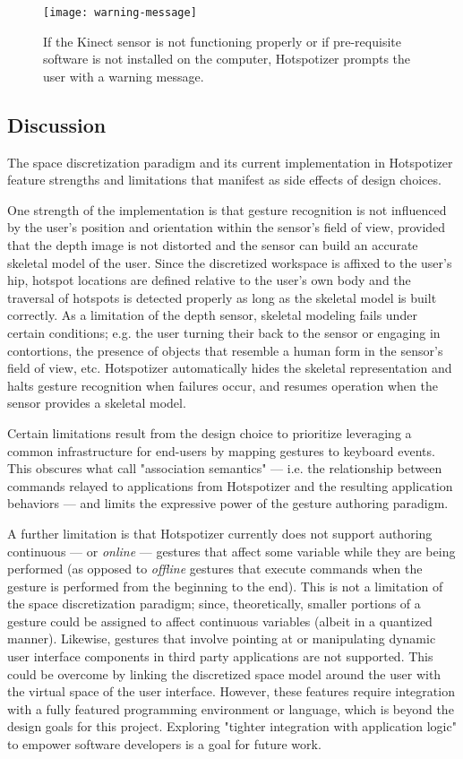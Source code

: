 \begin{SCfigure}[3][ht]
\centering
\texttt{[image: warning-message]}
\caption{If the Kinect sensor is not functioning properly or if pre-requisite software is not installed on the computer, Hotspotizer prompts the user with a warning message.}
\label{fig:warning-message}
\end{SCfigure}

\subsection{Discussion}

The space discretization paradigm and its current implementation in Hotspotizer feature strengths and limitations that manifest as side effects of design choices.

One strength of the implementation is that gesture recognition is not influenced by the user's position and orientation within the sensor's field of view, provided that the depth image is not distorted and the sensor can build an accurate skeletal model of the user. Since the discretized workspace is affixed to the user's hip, hotspot locations are defined relative to the user's own body and the traversal of hotspots is detected properly as long as the skeletal model is built correctly. As a limitation of the depth sensor, skeletal modeling fails under certain conditions; e.g. the user turning their back to the sensor or engaging in contortions, the presence of objects that resemble a human form in the sensor's field of view, etc. Hotspotizer automatically hides the skeletal representation and halts gesture recognition when failures occur, and resumes operation when the sensor provides a skeletal model.

Certain limitations result from the design choice to prioritize leveraging a common infrastructure for end-users by mapping gestures to keyboard events. This obscures what \textcite{Hartmann:2007} call "association semantics" --- i.e. the relationship between commands relayed to applications from Hotspotizer and the resulting application behaviors --- and limits the expressive power of the gesture authoring paradigm.

A further limitation is that Hotspotizer currently does not support authoring continuous --- or \emph{online} \parencite{Hoste:2014} --- gestures that affect some variable while they are being performed (as opposed to \emph{offline} gestures that execute commands when the gesture is performed from the beginning to the end). This is not a limitation of the space discretization paradigm; since, theoretically, smaller portions of a gesture could be assigned to affect continuous variables (albeit in a quantized manner). Likewise, gestures that involve pointing at or manipulating dynamic user interface components in third party applications are not supported. This could be overcome by linking the discretized space model around the user with the virtual space of the user interface. However, these features require integration with a fully featured programming environment or language, which is beyond the design goals for this project. Exploring "tighter integration with application logic" \parencite{Hartmann:2007} to empower software developers is a goal for future work.
